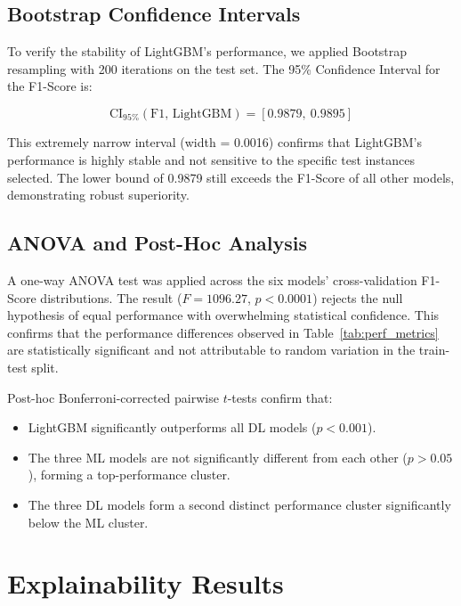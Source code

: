\subsection{Bootstrap Confidence Intervals}

To verify the stability of LightGBM's performance, we applied Bootstrap resampling with 200 iterations on the test set. The 95\% Confidence Interval for the F1-Score is:

\begin{equation}
    \text{CI}_{95\%}(\text{F1, LightGBM}) = [0.9879,\ 0.9895]
\end{equation}

This extremely narrow interval (width = 0.0016) confirms that LightGBM's performance is highly stable and not sensitive to the specific test instances selected. The lower bound of 0.9879 still exceeds the F1-Score of all other models, demonstrating robust superiority.

\subsection{ANOVA and Post-Hoc Analysis}

A one-way ANOVA test was applied across the six models' cross-validation F1-Score distributions. The result ($F = 1096.27$, $p < 0.0001$) rejects the null hypothesis of equal performance with overwhelming statistical confidence. This confirms that the performance differences observed in Table~\ref{tab:perf_metrics} are statistically significant and not attributable to random variation in the train-test split.

Post-hoc Bonferroni-corrected pairwise $t$-tests confirm that:
\begin{itemize}
    \item LightGBM significantly outperforms all DL models ($p < 0.001$).
    \item The three ML models are not significantly different from each other ($p > 0.05$), forming a top-performance cluster.
    \item The three DL models form a second distinct performance cluster significantly below the ML cluster.
\end{itemize}

\section{Explainability Results}


